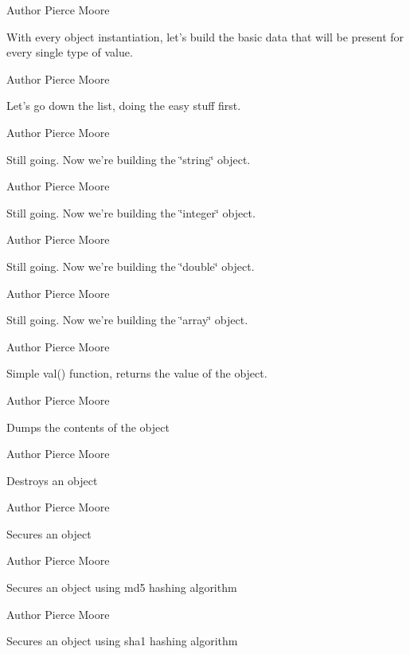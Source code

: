\begin{DoxyAuthor}{Author}
Pierce Moore
\end{DoxyAuthor}
With every object instantiation, let's build the basic data that will be present for every single type of value.

\begin{DoxyAuthor}{Author}
Pierce Moore
\end{DoxyAuthor}
Let's go down the list, doing the easy stuff first.

\begin{DoxyAuthor}{Author}
Pierce Moore
\end{DoxyAuthor}
Still going. Now we're building the \char`\"{}string\char`\"{} object.

\begin{DoxyAuthor}{Author}
Pierce Moore
\end{DoxyAuthor}
Still going. Now we're building the \char`\"{}integer\char`\"{} object.

\begin{DoxyAuthor}{Author}
Pierce Moore
\end{DoxyAuthor}
Still going. Now we're building the \char`\"{}double\char`\"{} object.

\begin{DoxyAuthor}{Author}
Pierce Moore
\end{DoxyAuthor}
Still going. Now we're building the \char`\"{}array\char`\"{} object.

\begin{DoxyAuthor}{Author}
Pierce Moore
\end{DoxyAuthor}
Simple val() function, returns the value of the object.

\begin{DoxyAuthor}{Author}
Pierce Moore
\end{DoxyAuthor}
Dumps the contents of the object

\begin{DoxyAuthor}{Author}
Pierce Moore
\end{DoxyAuthor}
Destroys an object

\begin{DoxyAuthor}{Author}
Pierce Moore
\end{DoxyAuthor}
Secures an object

\begin{DoxyAuthor}{Author}
Pierce Moore
\end{DoxyAuthor}
Secures an object using md5 hashing algorithm

\begin{DoxyAuthor}{Author}
Pierce Moore
\end{DoxyAuthor}
Secures an object using sha1 hashing algorithm

